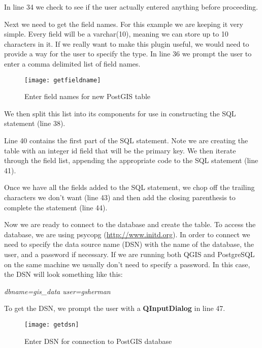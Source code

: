 In line 34 we check to see if the user actually entered anything before 
proceeding.

Next we need to get the field names. For this example we are keeping it very 
simple. Every field will be a varchar(10), meaning we can store up to 10 
characters in it. If we really want to make this plugin useful, we would need 
to provide a way for the user to specify the type. In line 36 we 
prompt the user to enter a comma delimited list of field names. 

\begin{figure}[ht]
\begin{center}
  \caption{Enter field names for new PostGIS table}\label{fig:getfieldname}\smallskip
  \texttt{[image: getfieldname]}
\end{center}
\end{figure}

We then split this list into its components for use in constructing the SQL 
statement (line 38). 

Line 40 contains the first part of the SQL statement. Note we are 
creating the table with an integer id field that will be the primary key. We 
then iterate through the field list, appending the appropriate code to the 
SQL statement (line 41).

Once we have all the fields added to the SQL statement, we chop off the 
trailing characters we don't want (line 43) and then add 
the closing parenthesis to complete the statement (line 44).

Now we are ready to connect to the database and create the table. To access 
the database, we are using psycopg (\url{http://www.initd.org}). In order 
to connect we need to specify the data source name (DSN) with the name of 
the database, the user, and a password if necessary. If we are running both 
QGIS and PostgreSQL on the same machine we usually don't need to specify a 
password. In this case, the DSN will look something like this:

\begin{center}
  \textsl{dbname=gis\_data user=gsherman}
\end{center}

To get the DSN, we prompt the user with a \textbf{QInputDialog} in line 47.

\begin{figure}[ht]
\begin{center}
  \caption{Enter DSN for connection to PostGIS database}\label{fig:getdsn}\smallskip
  \texttt{[image: getdsn]}
\end{center}
\end{figure}

